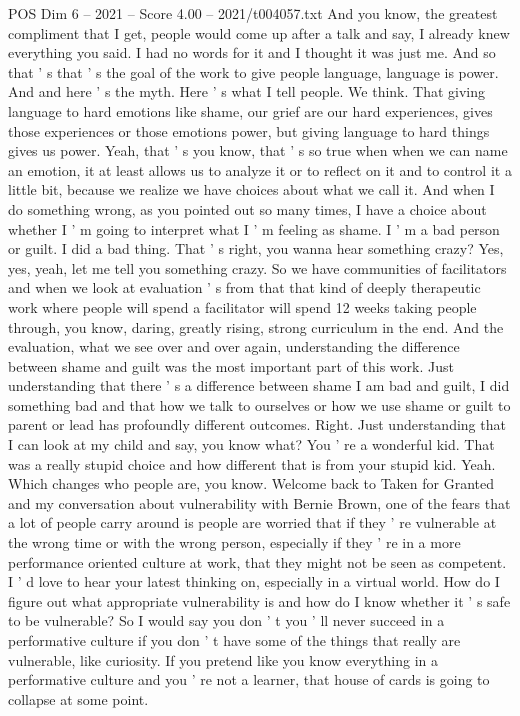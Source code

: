\begin{textsample}{POS Dim 6 – 2021 – Score 4.00 – 2021/t004057.txt}
And you know, the greatest compliment that I get, people would come up after a talk and say, I already knew everything you said.
I had no words for it and I thought it was just me.
And so that ' s that ' s the goal of the work to give people language, language is power.
And and here ' s the myth.
Here ' s what I tell people.
We think.
That giving language to hard emotions like shame, our grief are our hard experiences, gives those experiences or those emotions power, but giving language to hard things gives us power.
Yeah, that ' s you know, that ' s so true when when we can name an emotion, it at least allows us to analyze it or to reflect on it and to control it a little bit, because we realize we have choices about what we call it.
And when I do something wrong, as you pointed out so many times, I have a choice about whether I ' m going to interpret what I ' m feeling as shame.
I ' m a bad person or guilt.
I did a bad thing.
That ' s right, you wanna hear something crazy?
Yes, yes, yeah, let me tell you something crazy.
So we have communities of facilitators and when we look at evaluation ' s from that that kind of deeply therapeutic work where people will spend a facilitator will spend 12 weeks taking people through, you know, daring, greatly rising, strong curriculum in the end.
And the evaluation, what we see over and over again, understanding the difference between shame and guilt was the most important part of this work.
Just understanding that there ' s a difference between shame I am bad and guilt, I did something bad and that how we talk to ourselves or how we use shame or guilt to parent or lead has profoundly different outcomes.
Right.
Just understanding that I can look at my child and say, you know what?
You ' re a wonderful kid.
That was a really stupid choice and how different that is from your stupid kid.
Yeah.
Which changes who people are, you know.
Welcome back to Taken for Granted and my conversation about vulnerability with Bernie Brown, one of the fears that a lot of people carry around is people are worried that if they ' re vulnerable at the wrong time or with the wrong person, especially if they ' re in a more performance oriented culture at work, that they might not be seen as competent.
I ' d love to hear your latest thinking on, especially in a virtual world.
How do I figure out what appropriate vulnerability is and how do I know whether it ' s safe to be vulnerable?
So I would say you don ' t you ' ll never succeed in a performative culture if you don ' t have some of the things that really are vulnerable, like curiosity.
If you pretend like you know everything in a performative culture and you ' re not a learner, that house of cards is going to collapse at some point.

\end{textsample}
